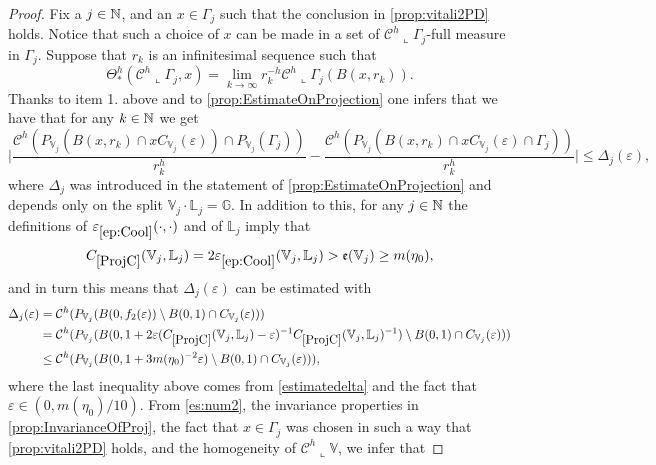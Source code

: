 \documentclass[10pt, a4paper,
oneside, headinclude,footinclude]{scrartcl}
\begin{document}
\begin{proof}
Fix a $j\in\mathbb{N}$, and an $x\in \Gamma_j$ such that the conclusion in \cref{prop:vitali2PD} holds. Notice that such a choice of $x$ can be made in a set of $\mathcal{C}^h\llcorner\Gamma_j$-full measure in $\Gamma_j$. Suppose that $r_k$ is an infinitesimal sequence such that 
$$
\Theta^h_*(\mathcal{C}^h\llcorner\Gamma_j,x)=\lim_{k\to \infty} r_k^{-h}\mathcal{C}^h\llcorner \Gamma_j(B(x,r_k)).
$$
Thanks to item 1. above and to \cref{prop:EstimateOnProjection} one infers that we have that for any $k\in \mathbb{N}$ we get
\begin{equation}
    \Big\lvert\frac{\mathcal{C}^h(P_{\mathbb V_j}(B(x,r_k)\cap xC_{\mathbb V_j}(\varepsilon))\cap P_{\mathbb V_j}(\Gamma_j))}{r_k^h}-\frac{\mathcal{C}^h(P_{\mathbb V_j}(B(x,r_k)\cap xC_{\mathbb V_j}(\varepsilon)\cap \Gamma_j))}{r_k^h}\Big\rvert\leq \Delta_j(\varepsilon),
    \label{es:num2}
\end{equation}
where $
\Delta_j$
was introduced in the statement of \cref{prop:EstimateOnProjection} and depends only on the split $\mathbb{V}_j\cdot\mathbb L_j=\mathbb{G}$. In addition to this, for any $j\in\mathbb{N}$ the definitions of $\oldep{ep:Cool}(\cdot,\cdot)$ and of $\mathbb{L}_j$ imply that
\begin{equation}
   \oldC{ProjC}(\mathbb{V}_j,\mathbb{L}_j)=2\oldep{ep:Cool}(\mathbb{V}_j,\mathbb{L}_j)>\mathfrak{e}(\mathbb{V}_j)\geq m(\eta_0), \label{estimatedelta}
\end{equation}
and in turn this means that $\Delta_j(\varepsilon)$ can be estimated with
\begin{equation}
    \begin{split}
        \Delta_j(\varepsilon)&=\mathcal{C}^h(P_{\mathbb{V}_j}(B(0,f_2(\varepsilon))\setminus B(0,1)\cap C_{\mathbb{V}_j}(\varepsilon)))\\
        &=\mathcal{C}^h(P_{\mathbb{V}_j}(B(0,1+2\varepsilon(\oldC{ProjC}(\mathbb V_j,\mathbb L_j)-\varepsilon)^{-1} \oldC{ProjC}(\mathbb{V}_j,\mathbb{L}_j)^{-1})\setminus B(0,1)\cap C_{\mathbb{V}_j}(\varepsilon)))\\
        &\leq \mathcal{C}^h(P_{\mathbb{V}_j}(B(0,1+3 m(\eta_0)^{-2}\varepsilon)\setminus B(0,1)\cap C_{\mathbb{V}_j}(\varepsilon))),
        \label{es:num3}
    \end{split}
\end{equation}
where the last inequality above comes from \eqref{estimatedelta} and the fact that $\varepsilon\in(0,m(\eta_0)/10)$.
From  \eqref{es:num2}, the invariance properties in \cref{prop:InvarianceOfProj}, the fact that $x\in\Gamma_j$ was chosen in such a way that \cref{prop:vitali2PD} holds, and the homogeneity of $\mathcal{C}^h\llcorner\mathbb V$, we infer that

\end{proof}
\end{document}
